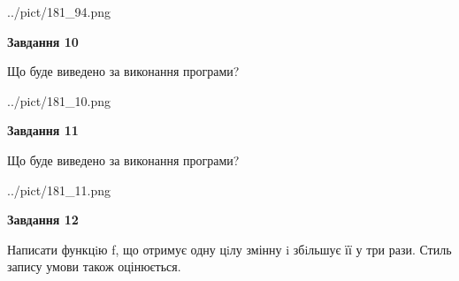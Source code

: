 \documentclass[12pt, ukrainian]{article}
\begin{document}
{\begin {large}
\begin{center}
	{../pict/181_94.png}
\end{center}
\newpage

{\begin {center}\textbf{Завдання 10}\end {center}}

Що буде виведено за виконання програми?\par
\begin{center}
	{../pict/181_10.png}
\end{center}
\newpage

{\begin {center}\textbf{Завдання 11}\end {center}}

Що буде виведено за виконання програми?\par
\begin{center}
	{../pict/181_11.png}
\end{center}
\newpage

{\begin {center}\textbf{Завдання 12}\end {center}}


Написати функцiю f, що отримує одну цiлу змінну i збiльшує її у три рази. Стиль запису умови також оцінюється.\par
\newpage

\end {large}}
\end{document}
